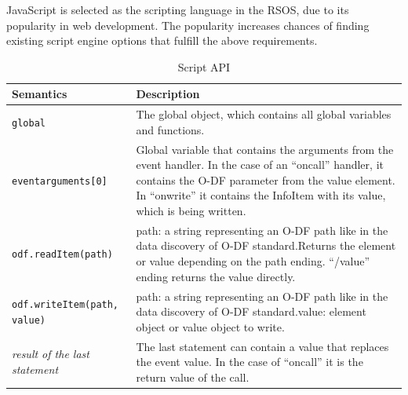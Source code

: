 JavaScript is selected as the scripting language in the RSOS, due to its popularity in web development. The popularity increases chances of finding existing script engine options that fulfill the above requirements.

\bgroup
\def\arraystretch{1.3} %
\begin{table}[H]
  \centering
  \caption{Script API}
  \smallskip
  \label{table:script-API}
  \selectfont %
  \scriptsize
  \begin{tabular}{|p{}|p{}|} \hline
    Semantics & Description \\ \hline
    \hline
    \verb!global! & The global object, which contains all global variables and functions. \\ \hline
    \verb!event!\newline \verb!arguments[0]! & Global variable that contains the arguments from the event handler. In the case of an ``oncall'' handler, it contains the O-DF parameter from the value element. In ``onwrite'' it contains the InfoItem with its value, which is being written. \\ \hline
    \verb!odf.readItem(path)! & path: a string representing an O-DF path like in the data discovery of O-DF standard.\newline Returns the element or value depending on the path ending. ``/value'' ending returns the value directly. \\ \hline
    \verb!odf.writeItem(path, value)! & path: a string representing an O-DF path like in the data discovery of O-DF standard.\newline value: element object or value object to write.\\ \hline
    \emph{result of the last statement} & The last statement can contain a value that replaces the event value. In the case of ``oncall'' it is the return value of the call. \\ \hline
  \end{tabular}
\end{table}
\egroup


